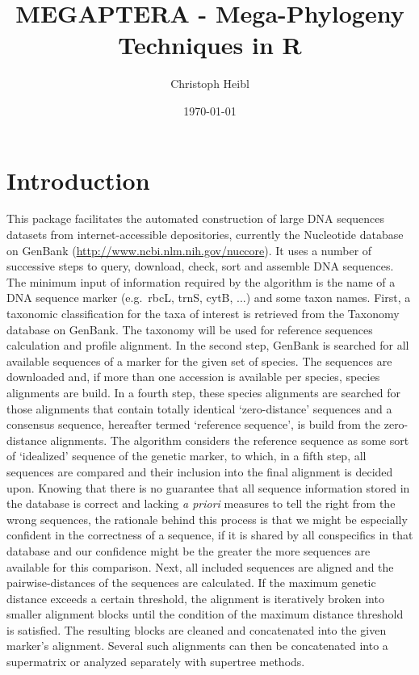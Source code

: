 \documentclass{article}
\title{MEGAPTERA - Mega-Phylogeny Techniques in R}
\author{Christoph Heibl}
\date{\today}
\begin{document}


\begin{Schunk}
\end{Schunk}

\maketitle
\tableofcontents

\section{Introduction}
This package facilitates the automated construction of large DNA sequences datasets from internet-accessible depositories, currently the Nucleotide database on GenBank (\href{http://www.ncbi.nlm.nih.gov/nuccore}{http://www.ncbi.nlm.nih.gov/nuccore}). It uses a number of successive steps to query, download, check, sort and assemble DNA sequences. The minimum input of information required by the algorithm is the name of a DNA sequence marker (e.g.~rbcL, trnS, cytB, ...) and some taxon names. First, a taxonomic classification for the taxa of interest is retrieved from the Taxonomy database on GenBank. The taxonomy will be used for reference sequences calculation and profile alignment. In the second step, GenBank is searched for all available sequences of a marker for the given set of species. The sequences are downloaded and, if more than one accession is available per species, species alignments are build. In a fourth step, these species alignments are searched for those alignments that contain totally identical `zero-distance' sequences and a consensus sequence, hereafter termed `reference sequence', is build from the zero-distance alignments. The algorithm considers the reference sequence as some sort of `idealized' sequence of the genetic marker, to which, in a fifth step, all sequences are compared and their inclusion into the final alignment is decided upon. Knowing that there is no guarantee that all sequence information stored in the database is correct and lacking \textit{a priori} measures to tell the right from the wrong sequences, the rationale behind this process is that we might be especially confident in the correctness of a sequence, if it is shared by all conspecifics in that database and our confidence might be the greater the more sequences are available for this comparison. Next, all included sequences are aligned and the pairwise-distances of the sequences are calculated. If the maximum genetic distance exceeds a certain threshold, the alignment is iteratively broken into smaller alignment blocks until the condition of the maximum distance threshold is satisfied. The resulting blocks are cleaned and concatenated into the given marker's alignment. Several such alignments can then be concatenated into a supermatrix or analyzed separately with supertree methods.
\end{document}
